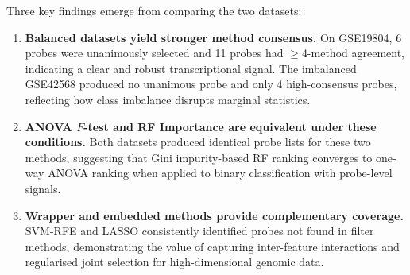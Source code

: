 Three key findings emerge from comparing the two datasets:

\begin{enumerate}
    \item \textbf{Balanced datasets yield stronger method consensus.} On GSE19804, 6 probes were unanimously selected and 11 probes had $\geq$4-method agreement, indicating a clear and robust transcriptional signal. The imbalanced GSE42568 produced no unanimous probe and only 4 high-consensus probes, reflecting how class imbalance disrupts marginal statistics.

    \item \textbf{ANOVA $F$-test and RF Importance are equivalent under these conditions.} Both datasets produced identical probe lists for these two methods, suggesting that Gini impurity-based RF ranking converges to one-way ANOVA ranking when applied to binary classification with probe-level signals.

    \item \textbf{Wrapper and embedded methods provide complementary coverage.} SVM-RFE and LASSO consistently identified probes not found in filter methods, demonstrating the value of capturing inter-feature interactions and regularised joint selection for high-dimensional genomic data.
\end{enumerate}